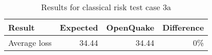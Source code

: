 \begin{table}[htbp]

\centering
\begin{tabular}{ l r r r }

\hline
\rowcolor{anti-flashwhite}
\bf{Result} & \bf{Expected} & \bf{OpenQuake} & \bf{Difference}\\
\hline
Average loss & 34.44 & 34.44 & 0\% \\
\hline
\end{tabular}

\caption{Results for classical risk test case 3a}
\label{tab:result-classical-risk-3a}
\end{table}